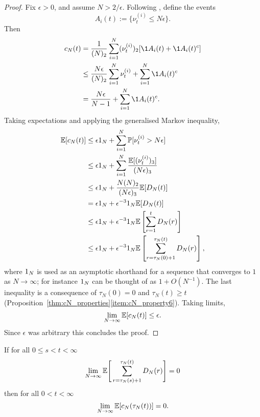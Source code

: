 \begin{proof}
Fix $\epsilon>0$, and assume $N>2/\epsilon$.
Following \textcite{mohle2003}, define the events
\begin{equation}\label{eq:define_Ai_events}
A_i(t) := \{ \nu_t^{(i)} \leq N\epsilon \} .
\end{equation}
Then
\begin{align*}
c_N(t)
&= \frac{1}{(N)_2} \sum_{i=1}^N (\nu_t^{(i)})_2 [\1{A_i(t)} + \1{A_i(t)^c}] \\
&\leq \frac{N\epsilon}{(N)_2} \sum_{i=1}^N \nu_t^{(i)}
        + \sum_{i=1}^N \1{A_i(t)^c} \\
&= \frac{N\epsilon}{N-1} + \sum_{i=1}^N \1{A_i(t)^c} .
\end{align*}
Taking expectations and applying the generalised Markov inequality,
\begin{align*}
\mathbb{E}[c_N(t)]
&\leq \epsilon1_N + \sum_{i=1}^N \mathbb{P}[ \nu_t^{(i)} > N\epsilon ] \\
&\leq \epsilon1_N 
        + \sum_{i=1}^N \frac{\mathbb{E}[ (\nu_t^{(i)})_3 ]}{(N\epsilon)_3} \\
&\leq \epsilon1_N + \frac{N(N)_2}{(N\epsilon)_3} \mathbb{E}[ D_N(t) ] \\
&= \epsilon1_N + \epsilon^{-3}1_N \mathbb{E}[ D_N(t) ] \\
&\leq \epsilon1_N + \epsilon^{-3}1_N 
        \mathbb{E}\left[ \sum_{r=1}^t D_N(r) \right] \\
&\leq \epsilon1_N + \epsilon^{-3}1_N
        \mathbb{E}\left[ \sum_{r=\tau_N(0)+1}^{\tau_N(t)} D_N(r) \right] ,
\end{align*}
where $1_N$ is used as an asymptotic shorthand for a sequence that converges to $1$ as $N\to\infty$; for instance $1_N$ can be thought of as $1 + O(N^{-1})$.
The last inequality is a consequence of $\tau_N(0)=0$ and $\tau_N(t) \geq t$ (Proposition~\ref{thm:cN_properties}\ref{item:cN_property6}).
Taking limits, 
\begin{equation*}
\lim_{N\to\infty} \mathbb{E}[c_N(t)] \leq \epsilon .
\end{equation*}
Since $\epsilon$ was arbitrary this concludes the proof.
\end{proof}


\begin{lemma} \label{thm:DNimpliescN_2}
If for all $0 \leq s < t < \infty$
\begin{equation*}
\lim_{ N \rightarrow \infty } \mathbb{E}\Bigg[ \sum_{ r = \tau_N( s ) + 1 }^{ \tau_N( t ) } D_N( r ) \Bigg] = 0
\end{equation*}
then for all $ 0 < t < \infty $
\begin{equation*}
\lim_{ N \rightarrow \infty } \mathbb{E}[ c_N( \tau_N(t) ) ] = 0 .
\end{equation*}
\end{lemma}

